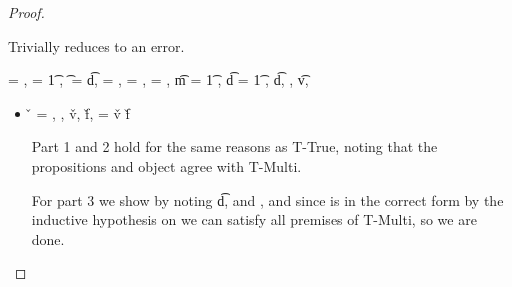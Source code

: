 \begin{lemma}
\begin{proof}
\begin{case}[T-DefMulti]
\begin{itemize}
\begin{subcase}[BE-DefMulti]
        Trivially reduces to an error.

\end{subcase}
\end{itemize}
\end{case}

\begin{case}[T-DefMethod]
  \e{} = { {} {}},
   = {\abs {\x{}} {\t{1}} {}},
  \t{} = { {\t{d}}},
  \thenprop{\prop{}} = {\topprop{}},
  \elseprop{\prop{}} = {\botprop{}},
  \object{} = {\emptyobject{}},
  \t{m} = {\ArrowOne {\x{}} {\t{1}} {\s{}}
                     {
                                 {}}
                     {}},
  \t{d} = {\ArrowOne {\x{}} {\t{1}} {\sp{}}
                     {
                                 {}}
                     {}},
  \judgementtwo {\propenv{}} { { {\t{d}}}},
  ,
  \judgementtwo {\propenv{}}
               { {\t{v}}},
           { {\s{}}}
           {
                       {}}
           {}

  \begin{itemize}
    \item[]
      \begin{subcase}[B-DefMethod]
       \v{} = { {\disptablep{}}},
        \opsem {\openv{}}
               {}
               { {\disptable{}}},
  \opsem {\openv{}}
         {}
         {\v{v}},
  \opsem {\openv{}}
         {}
         {\v{f}},
         \disptablep{} = {\extenddisptable {\disptable{}} 
                                {\v{v}}
                                {\v{f}}}

                                Part 1 and 2 hold for the same reasons as T-True, noting that the propositions
                                and object agree with T-Multi.

For part 3 we show
by noting \judgementtwo {} { {\t{d}}},
  and
  , and since \disptable{} is in the correct form by the inductive
  hypothesis on {} we can satisfy all premises of T-Multi, so we are done.



\end{subcase}
\end{itemize}
\end{case}
\end{proof}
\end{lemma}
